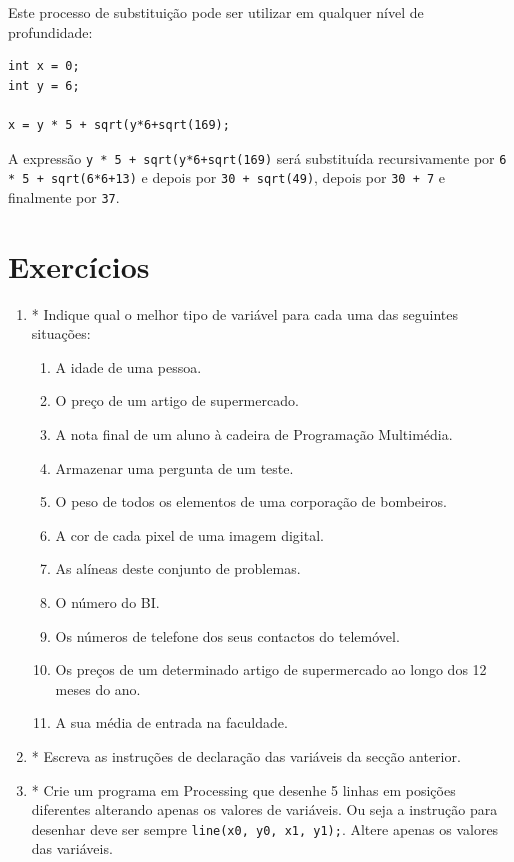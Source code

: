 Este processo de substituição pode ser utilizar em qualquer nível de profundidade:
\begin{lstlisting}
int x = 0;
int y = 6;

x = y * 5 + sqrt(y*6+sqrt(169);
\end{lstlisting}
A expressão \texttt{y * 5 + sqrt(y*6+sqrt(169)} será substituída recursivamente por \texttt{6 * 5 + sqrt(6*6+13)} e depois 
por \texttt{30 + sqrt(49)}, depois por \texttt{30 + 7} e finalmente por \texttt{37}.

\section{Exercícios}
\begin{enumerate}
\item \label{exe:3_tipos}
* Indique qual o melhor tipo de variável para cada uma das seguintes situações:
\begin{enumerate}
\item A idade de uma pessoa.
\item O preço de um artigo de supermercado.
\item A nota final de um aluno à cadeira de Programação Multimédia.
\item Armazenar uma pergunta de um teste.
\item O peso de todos os elementos de uma corporação de bombeiros.
\item A cor de cada pixel de uma imagem digital.
\item As alíneas deste conjunto de problemas.
\item O número do BI.
\item Os números de telefone dos seus contactos do telemóvel.
\item Os preços de um determinado artigo de supermercado ao longo dos 12 meses do ano.
\item A sua média de entrada na faculdade.
\end{enumerate}

\item \label{exe:3_declaracao}
* Escreva as instruções de declaração das variáveis da secção anterior.

\item \label{exe:3_1}
* Crie um programa em Processing que desenhe 5 linhas em posições diferentes alterando apenas os valores de variáveis. Ou seja a instrução para desenhar deve ser sempre \texttt{line(x0, y0, x1, y1);}. Altere apenas os valores das variáveis.


\end{enumerate}
